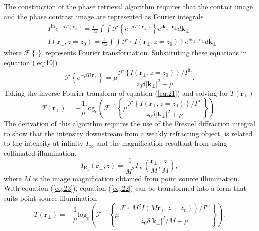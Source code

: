 \documentclass[10pt, a4paper, singlespacing]{report}
\begin{document}
The construction of the phase retrieval algorithm requires that the contact image and the phase contrast image are represented as Fourier integrals\cite{Pags2002}
\begin{align}\label{eq:20}
&I^{\mathrm{in}} e^{-\mu T(\mathbf{r}_{\perp})} = \frac{I^{\mathrm{in}}}{2 \pi} \int \int \mathscr{F} \left \{ e^{-\mu T(\mathbf{r}_{\perp})} \right \} e^{i \mathbf{k}_{\perp}\cdot \mathbf{r}_{\perp}} d \mathbf{k}_{\perp}
\\&I(\mathbf{r}_{\perp}, z=z_0) = \frac{1}{2 \pi}  \int \int \mathscr{F} \left \{ I (\mathbf{r}_{\perp}, z = z_0) \right \} e^{i \mathbf{k}_{\perp}\cdot \mathbf{r}_{\perp}} d \mathbf{k}_{\perp}
\end{align}
where $\mathscr{F}\left \{ \right \}$ represents Fourier transformation. Substituting these equations in equation (\ref{eq:19})
\begin{equation}\label{eq:21}
\mathscr{F}\left \{ e^{-\mu T(\mathbf{r}_{\perp}} \right \} = \mu \frac{\mathscr{F}\left \{ I(\mathbf{r}_{\perp}, z=z_0)\right \}/I^{\mathrm{in}}}{z_0 \delta |\mathbf{k}_{\perp}|^{2} + \mu}.
\end{equation}
Taking the inverse Fourier transform of equation (\ref{eq:21}) and solving for $T(\mathbf{r}_{\perp})$
\begin{equation}\label{eq:22}
T(\mathbf{r}_{\perp}) = - \frac{1}{\mu} \mathrm{log}_{e} \left ( \mathscr{F}^{-1} \left \{ \mu \frac{ \mathscr{F} \left \{I(\mathbf{r}_{\perp}, z=z_0) \right \} /  I^{\mathrm{in}}}{z_0 \delta |\mathbf{k}_{\perp}|^{2} + \mu}  \right \} \right ).
\end{equation}
The derivation of this algorithm requires the use of the Fresnel diffraction integral to show that the intensity downstream from a weakly refracting object, is related to the intensity at infinity $I_{\infty}$ and the magnification resultant from using collimated illumination\cite{Pags2002}.
\begin{equation}\label{eq:23}
I_{\mathrm{R_{1}}}(\mathbf{r_{\perp}}, z) = \frac{1}{M^2} I_{\infty} \left ( \frac{\mathbf{r_\perp}}{M}, \frac{z}{M} \right ),
\end{equation}
where $M$ is the image magnification obtained from point source illumination. With equation (\ref{eq:23}), equation (\ref{eq:22}) can be transformed into a form that suits point source illumination\cite{Pags2002}
\begin{equation}\label{eq:24}
T(\mathbf{r}_{\perp}) = - \frac{1}{\mu} \mathrm{log}_{e} \left ( \mathscr{F}^{-1} \left \{ \mu \frac{ \mathscr{F} \left \{M^2 I(M\mathbf{r}_{\perp}, z=z_0) \right \} /  I^{\mathrm{in}}}{z_0 \delta |\mathbf{k}_{\perp}|^{2}/M + \mu}  \right \} \right ).
\end{equation}
\end{document}
